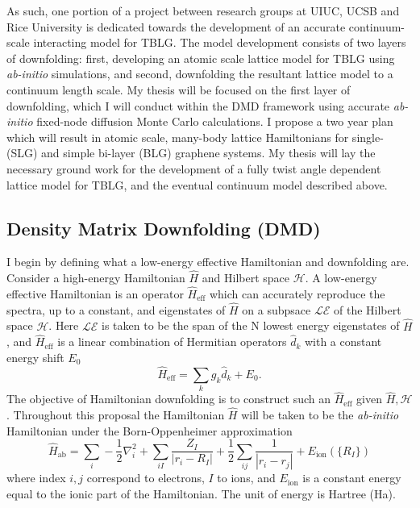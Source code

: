 \documentclass[12pt]{article}
\begin{document}
As such, one portion of a project between research groups at UIUC, UCSB and Rice University is dedicated towards the development of an accurate continuum-scale interacting model for TBLG.
The model development consists of two layers of downfolding: first, developing an atomic scale lattice model for TBLG using \textit{ab-initio} simulations, and second, downfolding the resultant lattice model to a continuum length scale.
My thesis will be focused on the first layer of downfolding, which I will conduct within the DMD framework using accurate \textit{ab-initio} fixed-node diffusion Monte Carlo calculations.
I propose a two year plan which will result in atomic scale, many-body lattice Hamiltonians for single- (SLG) and simple bi-layer (BLG) graphene systems.
My thesis will lay the necessary ground work for the development of a fully twist angle dependent lattice model for TBLG, and the eventual continuum model described above.

\subsection{Density Matrix Downfolding (DMD)}
I begin by defining what a low-energy effective Hamiltonian and downfolding are.
Consider a high-energy Hamiltonian $\hat{H}$ and Hilbert space $\mathcal{H}$.
A low-energy effective Hamiltonian is an operator $\hat{H}_\text{eff}$ which can accurately reproduce the spectra, up to a constant, and eigenstates of $\hat{H}$ on a subpsace $\mathcal{LE}$ of the Hilbert space $\mathcal{H}$.
Here $\mathcal{LE}$ is taken to be the span of the N lowest energy eigenstates of $\hat{H}$, and $\hat{H}_\text{eff}$ is a linear combination of Hermitian operators $\hat{d}_k$ with a constant energy shift $E_0$
\begin{equation}
\hat{H}_\text{eff} = \sum_{k} g_k \hat{d}_k  + E_0.
\label{eq:Heff}
\end{equation}
The objective of Hamiltonian downfolding is to construct such an $\hat{H}_\text{eff}$ given $\hat{H}, \mathcal{H}$.
Throughout this proposal the Hamiltonian $\hat{H}$ will be taken to be the \textit{ab-initio} Hamiltonian under the Born-Oppenheimer approximation
\begin{equation}
\hat{H}_\text{ab} = \sum_i -\frac{1}{2} \nabla_i^2 + \sum_{iI}\frac{Z_I}{|r_i - R_I|} + \frac{1}{2} \sum_{ij} \frac{1}{|r_i - r_j|} + E_\text{ion}(\{R_I\})  
\label{eq:Hab}
\end{equation} 
where index $i,j$ correspond to electrons, $I$ to ions, and $E_\text{ion}$ is a constant energy equal to the ionic part of the Hamiltonian. 
The unit of energy is Hartree (Ha).
\end{document}
